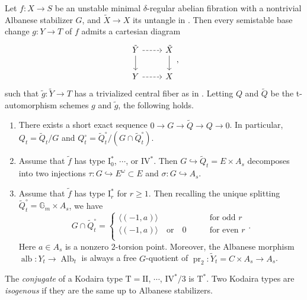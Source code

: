 \documentclass[reqno, letterpaper]{amsart}
\numberwithin{equation}{subsection}
\let\to\longrightarrow
\newcommand{\GG}{\mathbb{G}}
\DeclareMathOperator{\pr}{pr}
\DeclareMathOperator{\Alb}{Alb}
\DeclareMathOperator{\alb}{alb}
\begin{document}
		\begin{proposition} \label{prop:semistable reduction theorem tangled ver}
			Let $f : X \to S$ be an unstable minimal $\delta$-regular abelian fibration with a nontrivial Albanese stabilizer $G$, and $\tilde X \to X$ its untangle in . Then every semistable base change $g : Y \to T$ of $f$ admits a cartesian diagram
			\[\begin{tikzcd}
				\tilde Y \arrow[r, dashed] \arrow[d] & \tilde X \arrow[d] \\
				Y \arrow[r, dashed] & X
			\end{tikzcd},\]
			such that $\tilde g : \tilde Y \to T$ has a trivialized central fiber as in . Letting $Q$ and $\tilde Q$ be the t-automorphism schemes $g$ and $\tilde g$, the following holds.
			\begin{enumerate}
				\item There exists a short exact sequence $0 \to G \to \tilde Q \to Q \to 0$. In particular, $Q_t = \tilde Q_t / G$ and $Q^\circ_t = \tilde Q^\circ_t / (G \cap \tilde Q^\circ_t)$.
				
				\item Assume that $\tilde f$ has type $\mathrm I_0^*$, $\cdots$, or $\mathrm{IV}^*$. Then $G \hookrightarrow \tilde Q_t = E \times A_s$ decomposes into two injections $\tau : G \hookrightarrow E^\omega \subset E$ and $\sigma : G \hookrightarrow A_s$.
				
				\item Assume that $\tilde f$ has type $\mathrm I_r^*$ for $r \ge 1$. Then recalling the unique splitting $\tilde Q_t^\circ = \GG_m \times A_s$, we have
				\[ G \cap \tilde Q_t^\circ = \begin{cases}
					\langle (-1,a) \rangle \qquad & \mbox{for odd } r \\
					\langle (-1,a) \rangle \quad\mbox{or}\quad 0 \qquad & \mbox{for even } r \\
				\end{cases}.\]
				Here $a \in A_s$ is a nonzero $2$-torsion point. Moreover, the Albanese morphism $\alb : Y_t \to \Alb_t$ is always a free $G$-quotient of $\pr_2 : \tilde Y_t = C \times A_s \to A_s$.
			\end{enumerate}
		\end{proposition}
		
		\begin{definition} \label{def:isogeny and conjugate of Kodaira type}
			The \emph{conjugate} of a Kodaira type $\mathrm T = \mathrm{II}$, $\cdots$, $\mathrm{IV}^*/3$ is $\mathrm T^*$. Two Kodaira types are \emph{isogenous} if they are the same up to Albanese stabilizers.
		\end{definition}
		
\end{document}
